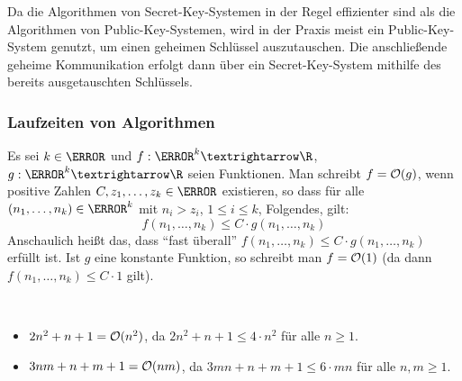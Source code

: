 Da die Algorithmen von Secret-Key-Systemen in der Regel effizienter sind als die Algorithmen von Public-Key-Systemen, wird in der Praxis meist ein Public-Key-System genutzt, um einen geheimen Schlüssel auszutauschen. Die anschließende geheime Kommunikation erfolgt dann über ein Secret-Key-System mithilfe des bereits ausgetauschten Schlüssels.



 \subsubsection{Laufzeiten von Algorithmen}

% 
%   
% 

 \begin{definition}[$\mc O$-Notation]
  Es sei $k \in \N$ und $f: \N^k → \R$, $g: \N^k → \R$ seien Funktionen. Man schreibt $f = \mathcal O(g)$, wenn positive Zahlen $C, z_1, \dots, z_k \in \N$ existieren, so dass für alle $(n_1, \dots, n_k) \in \N^k$ mit $n_i > z_i$, $1 \leq i \leq k$, Folgendes, gilt:
  \[f(n_1, \dots, n_k) \leq C \cdot g(n_1, \dots, n_k)\]
  Anschaulich heißt das, dass \enquote{fast überall} $f(n_1, \dots, n_k) \leq C \cdot g(n_1, \dots, n_k)$ erfüllt ist. Ist $g$ eine konstante Funktion, so schreibt man $f = \mathcal O(1)$ (da dann $f(n_1, \dots, n_k) \leq C \cdot 1$ gilt).
 \end{definition}

 \begin{example}{\ }
  \begin{itemize}
   \item $2n^2 + n + 1  = \mathcal O(n^2)$, da $2n^2 + n + 1 \leq 4 \cdot n^2$ für alle $n\geq1$.
   \item $3nm+ n + m +1= \mathcal O(nm)$, da $3mn + n + m + 1 \leq 6 \cdot mn$ für alle $n, m\geq 1$.
  \end{itemize}

 \end{example}

